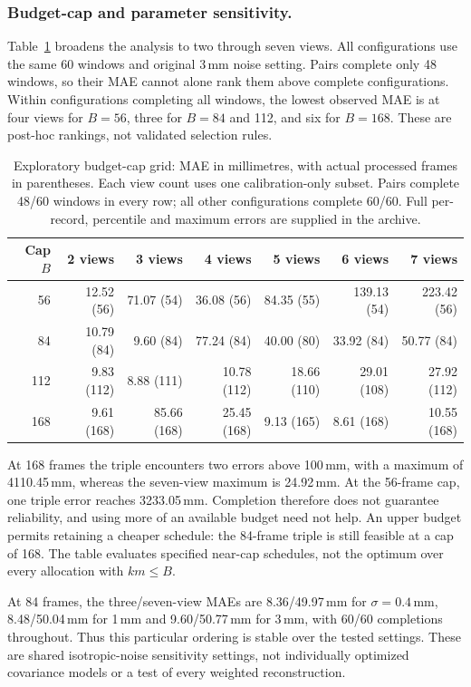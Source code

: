 \documentclass{iopjournal}
\begin{document}
\subsubsection{Budget-cap and parameter sensitivity.}
Table~\ref{tab:budgetcaps} broadens the analysis to two through seven views.
All configurations use the same 60 windows and original 3\,mm noise setting.
Pairs complete only 48 windows, so their MAE cannot alone rank them above
complete configurations. Within configurations completing all windows, the
lowest observed MAE is at four views for $B=56$, three for $B=84$ and 112,
and six for $B=168$. These are post-hoc rankings, not validated selection rules.

\begin{table}
\caption{Exploratory budget-cap grid: MAE in millimetres, with actual processed
frames in parentheses. Each view count uses one calibration-only subset.
Pairs complete 48/60 windows in every row; all other configurations complete
60/60. Full per-record, percentile and maximum errors are supplied in the archive.}
\centering
\small
\begin{tabular}{rrrrrrr}
\hline
Cap $B$ & 2 views & 3 views & 4 views & 5 views & 6 views & 7 views\\
\hline
56 & 12.52 (56) & 71.07 (54) & 36.08 (56) & 84.35 (55) & 139.13 (54) & 223.42 (56)\\
84 & 10.79 (84) & 9.60 (84) & 77.24 (84) & 40.00 (80) & 33.92 (84) & 50.77 (84)\\
112 & 9.83 (112) & 8.88 (111) & 10.78 (112) & 18.66 (110) & 29.01 (108) & 27.92 (112)\\
168 & 9.61 (168) & 85.66 (168) & 25.45 (168) & 9.13 (165) & 8.61 (168) & 10.55 (168)\\
\hline
\end{tabular}
\label{tab:budgetcaps}
\end{table}

At 168 frames the triple encounters two errors above 100\,mm, with a maximum
of 4110.45\,mm, whereas the seven-view maximum is 24.92\,mm. At the 56-frame
cap, one triple error reaches 3233.05\,mm. Completion therefore does not
guarantee reliability, and using more of an available budget need not help.
An upper budget permits retaining a cheaper schedule: the 84-frame triple
is still feasible at a cap of 168. The table evaluates specified near-cap
schedules, not the optimum over every allocation with $km\leq B$.

At 84 frames, the three/seven-view MAEs are 8.36/49.97\,mm for
$\sigma=0.4$\,mm, 8.48/50.04\,mm for 1\,mm and 9.60/50.77\,mm for
3\,mm, with 60/60 completions throughout. Thus this particular ordering is
stable over the tested settings. These are shared isotropic-noise sensitivity
settings, not individually optimized covariance models or a test of every
weighted reconstruction.
\end{document}
